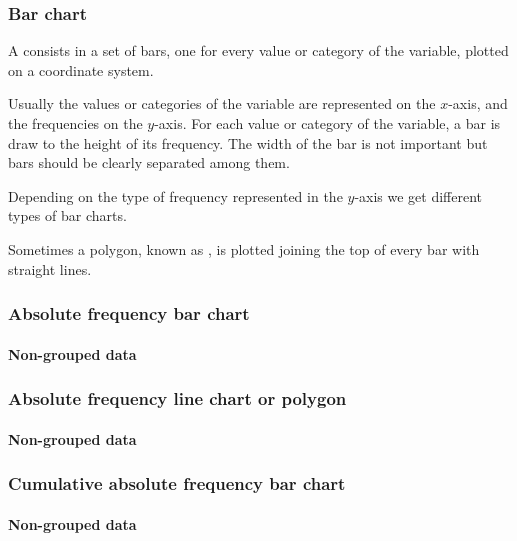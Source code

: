 \begin{frame}
\frametitle{Bar chart}
A  consists in a set of bars, one for every value or category of the variable, plotted on a
coordinate system.

Usually the values or categories of the variable are represented on the $x$-axis, and the frequencies on the $y$-axis. 
For each value or category of the variable, a bar is draw to the height of its frequency.
The width of the bar is not important but bars should be clearly separated among them. 

Depending on the type of frequency represented in the $y$-axis we get different types of bar charts.
 
Sometimes a polygon, known as , is plotted joining the top of every bar with
straight lines.
\end{frame}



\begin{frame}
\frametitle{Absolute frequency bar chart}
\framesubtitle{Non-grouped data}
\begin{center}
\scalebox{0.6}{} 
\end{center}
\end{frame}


\begin{frame}
\frametitle{Absolute frequency line chart or polygon}
\framesubtitle{Non-grouped data}
\begin{center}
\scalebox{0.6}{} 
\end{center}
\end{frame}


\begin{frame}
\frametitle{Cumulative absolute frequency bar chart}
\framesubtitle{Non-grouped data}
\begin{center}
\scalebox{0.6}{} 
\end{center}
\end{frame}


